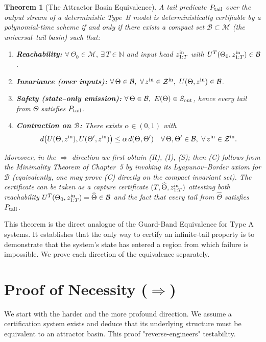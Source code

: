 \documentclass[12pt]{article}
\theoremstyle{definition}
\theoremstyle{plain}
\newtheorem{theorem}{Theorem}[section]
\begin{document}
\begin{theorem}[The Attractor Basin Equivalence]
\label{thm:basin_equivalence}
A tail predicate $P_{\rm tail}$ over the output stream of a deterministic Type~B model is deterministically certifiable by a polynomial‐time scheme if and only if there exists a compact set $\mathcal B\subset\mathcal M$ (the universal–tail basin) such that:

\begin{enumerate}
  \item[\textnormal{(R)}] \textbf{Reachability:}
  $\forall\,\Theta_0\in\mathcal M,\ \exists\,T\in\mathbb N$ and input head $z^{\rm in}_{1:T}$ with $U^T(\Theta_0,z^{\rm in}_{1:T})\in\mathcal B$.
  \item[\textnormal{(I)}] \textbf{Invariance (over inputs):}
  $\forall\,\Theta\in\mathcal B,\ \forall\,z^{\rm in}\in\mathcal Z^{\rm in},\ U(\Theta,z^{\rm in})\in\mathcal B$.
  \item[\textnormal{(S)}] \textbf{Safety (state–only emission):}
  $\forall\,\Theta\in\mathcal B,\ E(\Theta)\in S_{\rm out}$, hence every tail from $\Theta$ satisfies $P_{\rm tail}$.
  \item[\textnormal{(C)}] \textbf{Contraction on $\mathcal B$:}
  There exists $\alpha\in(0,1)$ with
  \[
    d\bigl(U(\Theta,z^{\rm in}),U(\Theta',z^{\rm in})\bigr)\le \alpha\,d(\Theta,\Theta')
    \quad\forall\,\Theta,\Theta'\in\mathcal B,\ \forall\,z^{\rm in}\in\mathcal Z^{\rm in}.
  \]
\end{enumerate}

Moreover, in the $\Rightarrow$ direction we first obtain (R), (I), (S); then (C) follows from the Minimality Theorem of Chapter~5 by invoking its Lyapunov–Border axiom for $\mathcal B$ (equivalently, one may prove (C) directly on the compact invariant set). The certificate can be taken as a \emph{capture certificate} $(T,\widehat\Theta,z^{\rm in}_{1:T})$ attesting both reachability $U^T(\Theta_0,z^{\rm in}_{1:T})=\widehat\Theta\in\mathcal B$ and the fact that every tail from $\widehat\Theta$ satisfies $P_{\rm tail}$.
\end{theorem}


This theorem is the direct analogue of the Guard-Band Equivalence for Type A systems. It establishes that the only way to certify an infinite-tail property is to demonstrate that the system's state has entered a region from which failure is impossible. We prove each direction of the equivalence separately.

\section{Proof of Necessity ($\Rightarrow$)}
We start with the harder and the more profound direction. We assume a certification system exists and deduce that its underlying structure must be equivalent to an attractor basin. This proof "reverse-engineers" testability.
\end{document}

